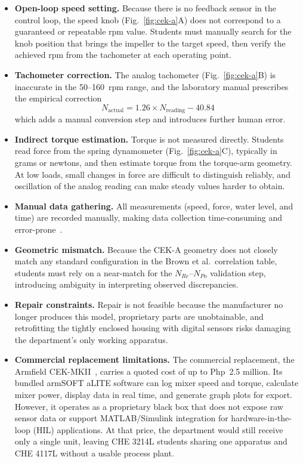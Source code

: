 \begin{itemize}
    \item \textbf{Open-loop speed setting.} Because there is no feedback sensor in the control loop, the speed knob (Fig.~\ref{fig:cek-a}A) does not correspond to a guaranteed or repeatable rpm value. Students must manually search for the knob position that brings the impeller to the target speed, then verify the achieved rpm from the tachometer at each operating point.
    \item \textbf{Tachometer correction.} The analog tachometer (Fig.~\ref{fig:cek-a}B) is inaccurate in the 50--160~rpm range, and the laboratory manual prescribes the empirical correction
    \begin{equation}
    N_{\text{actual}} = 1.26 \times N_{\text{reading}} - 40.84
    \label{eq:tach-correction}
    \end{equation}
    which adds a manual conversion step and introduces further human error.
    \item \textbf{Indirect torque estimation.} Torque is not measured directly. Students read force from the spring dynamometer (Fig.~\ref{fig:cek-a}C), typically in grams or newtons, and then estimate torque from the torque-arm geometry. At low loads, small changes in force are difficult to distinguish reliably, and oscillation of the analog reading can make steady values harder to obtain.
    \item \textbf{Manual data gathering.} All measurements (speed, force, water level, and time) are recorded manually, making data collection time-consuming and error-prone~\citep{feisel2005}.
    \item \textbf{Geometric mismatch.} Because the CEK-A geometry does not closely match any standard configuration in the Brown et al.\ correlation table, students must rely on a near-match for the $N_{Re}$--$N_{Po}$ validation step, introducing ambiguity in interpreting observed discrepancies.
    \item \textbf{Repair constraints.} Repair is not feasible because the manufacturer no longer produces this model, proprietary parts are unobtainable, and retrofitting the tightly enclosed housing with digital sensors risks damaging the department's only working apparatus.
    \item \textbf{Commercial replacement limitations.} The commercial replacement, the Armfield CEK-MKII~\citep{armfield2023}, carries a quoted cost of up to Php~2.5 million. Its bundled armSOFT aLITE software can log mixer speed and torque, calculate mixer power, display data in real time, and generate graph plots for export. However, it operates as a proprietary black box that does not expose raw sensor data or support MATLAB/Simulink integration for hardware-in-the-loop (HIL) applications. At that price, the department would still receive only a single unit, leaving CHE 3214L students sharing one apparatus and CHE 4117L without a usable process plant.
\end{itemize}

